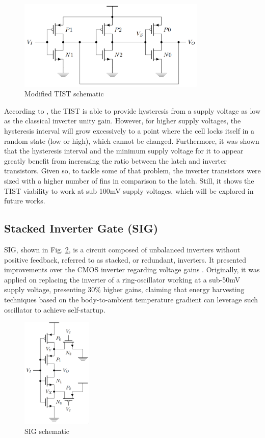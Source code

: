 \documentclass[diss,pgmicro,english]{iiufrgs}
\begin{document}
\begin{figure}[t]
  \centering
    \includegraphics[width=0.8\textwidth, trim={0cm 0cm 0cm 0cm}, clip]{TIST.png}
     \caption{Modified TIST schematic \cite{rabaey2003digital}}
  \label{fig:TIST}
\end{figure}

According to \cite{thiagoTIST}, the TIST is able to provide hysteresis from a supply voltage as low as the classical inverter unity gain. However, for higher supply voltages, the hysteresis interval will grow excessively to a point where the cell locks itself in a random state (low or high), which cannot be changed. Furthermore, it was shown that the hysteresis interval and the minimum supply voltage for it to appear greatly benefit from increasing the ratio between the latch and inverter transistors. Given so, to tackle some of that problem, the inverter transistors were sized with a higher number of fins in comparison to the latch. Still, it shows the TIST viability to work at sub 100mV supply voltages, which will be explored in future works.

\subsection{Stacked Inverter Gate (SIG)}

SIG, shown in Fig. \ref{fig:SIG}, is a circuit composed of unbalanced inverters without positive feedback, referred to as stacked, or redundant, inverters. It presented improvements over the CMOS inverter regarding voltage gains \cite{bose2018stacked, luo2017sub}. Originally, it was applied on replacing the inverter of a ring-oscillator working at a sub-50mV supply voltage, presenting 30\% higher gains, claiming that energy harvesting techniques based on the body-to-ambient temperature gradient can leverage such oscillator to achieve self-startup.

\begin{figure}[]
  \centering
    \includegraphics[width=0.3\textwidth]{SIG.png}
     \caption{SIG schematic \cite{bose2018stacked}}
  \label{fig:SIG}
\end{figure}
\end{document}
